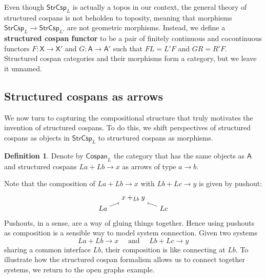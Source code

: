 \documentclass{amsart}
\newcommand{\A}{\cat{A}}
\newcommand{\X}{\cat{X}}
\newcommand{\Csp}{\cat{Cospan}}
\newcommand{\StrCsp}{\cat{StrCsp}}
\newcommand{\defn}[1]{\textbf{#1}}
\newcommand{\cat}[1]{\mathsf{#1}}
\newcommand{\from}{\colon}
\newcommand{\csp}[3]{#1 + #3 \to #2}
\theoremstyle{remark}
\theoremstyle{definition}
\newtheorem{definition}[theorem]{Definition}
\begin{document}
Even though $ \StrCsp_L $ is actually a topos in our context, the
general theory of structured cospans is not beholden to toposity,
meaning that morphisms $ \StrCsp_L \to \StrCsp_{L'} $ are not
geometric morphisms. Instead, we define a \defn{structured cospan
  functor} to be a pair of finitely continuous and cocontinuous
functors $ F \from \X \to \X' $ and $ G \from \A \to \A' $ such that
$ FL=L'F $ and $ GR = R'F $.  Structured cospan categories and their
morphisms form a category, but we leave it unnamed.


\subsection{Structured cospans as arrows}
\label{sec:StrCsp-as-Arrows}

We now turn to capturing the compositional structure that
truly motivates the invention of structured cospans.  To do this, we
shift perspectives of structured cospans as objects in $ \StrCsp_{L} $
to structured cospans as morphisms. 

\begin{definition}
\label{def:strcsp-arr}  
  Denote by $ \Csp_{L} $ the category that has the same objects as
  $ \A $ and structured cospans $ \csp{La}{x}{Lb} $ as arrows of
  type $ a \to b $.
\end{definition}

Note that the composition of $ \csp{La}{x}{Lb} $ with $
\csp{Lb}{y}{Lc} $ is given by pushout:
%
\[
  \begin{tikzpicture}
    \begin{scope}[]
    \node (1) at (0,0) {\( La \)};
    \node (2) at (1.5,0.5) {\( x +_{Lb} y \)};
    \node (3) at (3,0) {\( Lc \)};
     \draw [->] (1) to node [] {\scriptsize{\(  \)}} (2);
    \draw [->] (3) to node [] {\scriptsize{\(  \)}} (2); 
    \end{scope}
  \end{tikzpicture}
\]
% 
Pushouts, in a sense, are a way of gluing things together. Hence using
pushouts as composition is a sensible way to model system
connection. Given two systems
%
\[
  \csp{La}{x}{Lb}
  \quad
  \text{ and }
  \quad
  \csp{Lb}{y}{Lc}
\]
% 
sharing a common interface $ Lb $, their composition is like
connecting at $ Lb $. To illustrate how the structured cospan
formalism allows us to connect together systems, we return to the open
graphs example.
\end{document}

